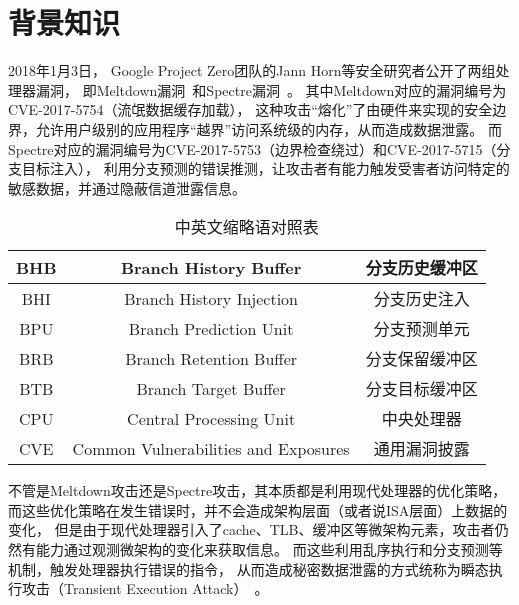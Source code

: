 %
%

\chapter{背景知识}\label{chap2}

2018年1月3日， Google Project Zero团队的Jann Horn等安全研究者公开了两组处理器漏洞，
即Meltdown漏洞~\cite{Lipp2018meltdown}和Spectre漏洞~\cite{kocher2019spectre}。
其中Meltdown对应的漏洞编号为CVE-2017-5754（流氓数据缓存加载），
这种攻击“熔化”了由硬件来实现的安全边界，允许用户级别的应用程序“越界”访问系统级的内存，从而造成数据泄露。
而Spectre对应的漏洞编号为CVE-2017-5753（边界检查绕过）和CVE-2017-5715（分支目标注入），
利用分支预测的错误推测，让攻击者有能力触发受害者访问特定的敏感数据，并通过隐蔽信道泄露信息。

\begin{table}[!h]
\centering
\small
\caption{中英文缩略语对照表}
\begin{tabular}{|c|c|c|}
\hline
BHB & Branch History Buffer & 分支历史缓冲区 \\
\hline
BHI & Branch History Injection & 分支历史注入 \\
\hline
BPU & Branch Prediction Unit & 分支预测单元 \\
\hline
BRB & Branch Retention Buffer & 分支保留缓冲区 \\
\hline
BTB & Branch Target Buffer & 分支目标缓冲区 \\
\hline
CPU & Central Processing Unit & 中央处理器 \\
\hline
CVE & Common Vulnerabilities and Exposures & 通用漏洞披露 \\
\hline
\end{tabular}
\end{table}

不管是Meltdown攻击还是Spectre攻击，其本质都是利用现代处理器的优化策略，
而这些优化策略在发生错误时，并不会造成架构层面（或者说ISA层面）上数据的变化，
但是由于现代处理器引入了cache、TLB、缓冲区等微架构元素，攻击者仍然有能力通过观测微架构的变化来获取信息。
而这些利用乱序执行和分支预测等机制，触发处理器执行错误的指令，
从而造成秘密数据泄露的方式统称为瞬态执行攻击（Transient Execution Attack）~\cite{xiong2021survey}。